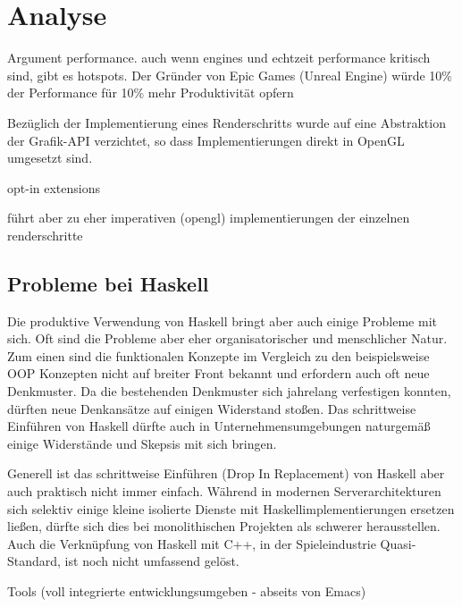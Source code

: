 \chapter{Analyse}
\label{chap:analyse}
Argument performance. auch wenn engines und echtzeit performance kritisch sind, gibt es hotspots.
Der Gründer von Epic Games (Unreal Engine) würde 10\% der Performance für 10\% mehr Produktivität opfern \parencite[Seite 20]{Sweeney2006} %

Bezüglich der Implementierung eines Renderschritts wurde auf eine Abstraktion der Grafik-API verzichtet, so dass Implementierungen direkt in OpenGL umgesetzt sind.

opt-in extensions

führt aber zu eher imperativen (opengl) implementierungen der einzelnen renderschritte

\section{Probleme bei Haskell}\label{sec:probleme-haskell}

Die produktive Verwendung von Haskell bringt aber auch einige Probleme mit sich. Oft sind die Probleme aber eher organisatorischer und menschlicher Natur. Zum einen sind die funktionalen Konzepte im Vergleich zu den beispielsweise OOP Konzepten nicht auf breiter Front bekannt und erfordern auch oft neue Denkmuster. Da die bestehenden Denkmuster sich jahrelang verfestigen konnten, dürften neue Denkansätze auf einigen Widerstand stoßen. Das schrittweise Einführen von Haskell dürfte auch in Unternehmensumgebungen naturgemäß einige Widerstände und Skepsis mit sich bringen.

Generell ist das schrittweise Einführen (Drop In Replacement) von Haskell aber auch praktisch nicht immer einfach. Während in modernen Serverarchitekturen sich selektiv einige kleine isolierte Dienste mit Haskellimplementierungen ersetzen ließen, dürfte sich dies bei monolithischen Projekten als schwerer herausstellen. Auch die Verknüpfung von Haskell mit C++, in der Spieleindustrie Quasi-Standard, ist noch nicht umfassend gelöst.

Tools (voll integrierte entwicklungsumgeben - abseits von Emacs)
